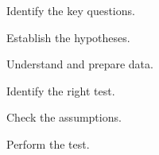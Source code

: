 	\begin{numberedlist}
		\item Identify the key questions.
		\item Establish the hypotheses.
		\item Understand and prepare data.
		\item Identify the right test.
		\item Check the assumptions.
		\item Perform the test.
	\end{numberedlist}

\newpage{}
